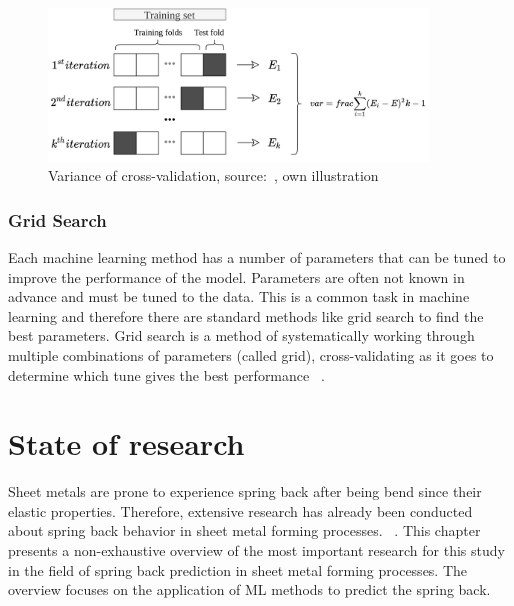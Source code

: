 \begin{figure}[h]
    \begin{tcolorbox}[arc=0pt,boxrule=0.5pt]
        \centering
        \includegraphics[trim=left botm right top, width=0.9\textwidth]
        {chap2/images/cross_validation}
        \caption{Variance of cross-validation, source:~\cite[p. 260]{muller2016introduction}, own
        illustration }
        \label{fig:cross-validation}
    \end{tcolorbox}
\end{figure}

\subsubsection{Grid Search}\label{subsubsec:grid-search}
Each machine learning method has a number of parameters that can be tuned to improve the
performance of the model.
Parameters are often not known in advance and must be tuned to the data.
This is a common task in machine learning and therefore there are standard methods like
grid search to find the best parameters.
Grid search is a method of systematically working through multiple combinations of
parameters (called grid), cross-validating as it goes to determine which tune gives the best
performance
~\cite[p. 260--275]{muller2016introduction}.


\section{State of research}\label{sec:state-of-research}
Sheet metals are prone to experience spring back after being bend since their elastic properties.
Therefore, extensive research has already been conducted about spring back behavior in sheet metal forming processes.
~\cite[p. 566]{liu2021deep}.
This chapter presents a non-exhaustive overview of the most important research for this study in the field of
spring back prediction in sheet metal forming processes.
The overview focuses on the application of \ac{ML} methods to predict the spring back.

